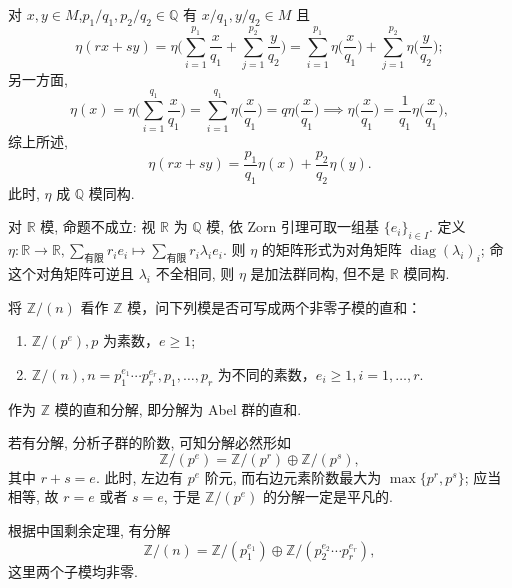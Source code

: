 \begin{solution}
    对 $ x,y\in M$,$ p_{1}/q_{1},p_{2}/q_{2}\in\mathbb{Q}$ 有 $x/q_{1}, y/q_{2}\in M$ 且
        \[
            \eta(r x+s y)=\eta\Big(\sum_{i=1}^{p_{1}}\frac{x}{q_{1}}+\sum_{j=1}^{p_{2}}\frac{y}{q_{2}}\Big)
            =\sum_{i=1}^{p_{1}}\eta\Big(\frac{x}{q_{1}}\Big)+\sum_{j=1}^{p_{2}}\eta\Big(\frac{y}{q_{2}}\Big);
        \]
    另一方面, 
        \[
            \eta(x)=\eta\Big(\sum_{i=1}^{q_{1}}\frac{x}{q_{1}}\Big)=\sum_{i=1}^{q_{1}}\eta\Big(\frac{x}{q_{1}}\Big)=q\eta\Big(\frac{x}{q_{1}}\Big)\implies \eta\Big(\frac{x}{q_{1}}\Big)=\frac{1}{q_{1}}\eta\Big(\frac{x}{q_{1}}\Big),
        \]
    综上所述, 
        \[
            \eta(r x+s y)=\frac{p_{1}}{q_{1}}\eta(x)+\frac{p_{2}}{q_{2}}\eta(y).
        \]
    此时, $\eta$ 成 $\mathbb{Q}$ 模同构.
    \par 对 $\mathbb{R}$ 模, 命题不成立: 视 $\mathbb{R}$ 为 $\mathbb{Q}$ 模, 依 Zorn 引理可取一组基 $\{e_{i}\}_{i\in I}$. 
    定义 $\eta\colon \mathbb{R}\to\mathbb{R}, \sum_{\text{有限}}r_{i}e_{i}\mapsto\sum_{\text{有限}}r_{i}\lambda_{i}e_{i}$. 
    则 $\eta$ 的矩阵形式为对角矩阵 $\operatorname{diag}(\lambda_{i})_{i}$; 命这个对角矩阵可逆且 $\lambda_{i}$ 不全相同, 则 $\eta$ 是加法群同构, 但不是 $\mathbb{R}$ 模同构.
\end{solution}

\setcounter{pb}{19}
\begin{problem}
    将 $ \mathbb{Z}/(n) $ 看作 $ \mathbb{Z} $ 模，问下列模是否可写成两个非零子模的直和：
    \begin{enumerate}[label=(\roman*)]
        \item $ \mathbb{Z}/(p^e), p $ 为素数，$ e \geq 1 $;
        \item $ \mathbb{Z}/(n), n = p_1^{e_1} \cdots p_r^{e_r}, p_1, \dots, p_r $ 为不同的素数，$ e_i \geq 1, i = 1, \dots, r $.
    \end{enumerate}
\end{problem}

\begin{solution}
    作为 $\mathbb{Z}$ 模的直和分解, 即分解为 Abel 群的直和.
    \par 若有分解, 分析子群的阶数, 可知分解必然形如
        \[
            \mathbb{Z}/(p^{e})=\mathbb{Z}/(p^{r})\oplus\mathbb{Z}/(p^{s}),
        \]
    其中 $r+s=e$. 此时, 左边有 $p^{e}$ 阶元, 而右边元素阶数最大为 $\max\{p^{r},p^{s}\}$; 应当相等, 故 $r=e$ 或者 $s=e$, 于是 $\mathbb{Z}/(p^{e})$ 的分解一定是平凡的.
    \par 根据中国剩余定理, 有分解
        \[
            \mathbb{Z}/(n)=\mathbb{Z}/(p_{1}^{e_{1}})\oplus\mathbb{Z}/(p_{2}^{e_{2}}\cdots p_{r}^{e_{r}}),
        \]
    这里两个子模均非零. 
\end{solution}

